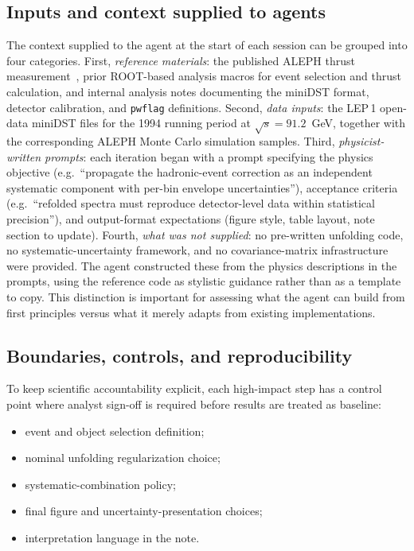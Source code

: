 \subsection{Inputs and context supplied to agents}
\label{sec:agent_inputs}

The context supplied to the agent at the start of each session can be grouped into four categories.
First, \textit{reference materials}: the published ALEPH thrust measurement~\cite{Heister:2003aj}, prior ROOT-based analysis macros for event selection and thrust calculation, and internal analysis notes documenting the miniDST format, detector calibration, and \texttt{pwflag} definitions.
Second, \textit{data inputs}: the LEP\,1 open-data miniDST files for the 1994 running period at $\sqrt{s}=91.2$~GeV, together with the corresponding ALEPH Monte Carlo simulation samples.
Third, \textit{physicist-written prompts}: each iteration began with a prompt specifying the physics objective (e.g.\ ``propagate the hadronic-event correction as an independent systematic component with per-bin envelope uncertainties''), acceptance criteria (e.g.\ ``refolded spectra must reproduce detector-level data within statistical precision''), and output-format expectations (figure style, table layout, note section to update).
Fourth, \textit{what was not supplied}: no pre-written unfolding code, no systematic-uncertainty framework, and no covariance-matrix infrastructure were provided. The agent constructed these from the physics descriptions in the prompts, using the reference code as stylistic guidance rather than as a template to copy. This distinction is important for assessing what the agent can build from first principles versus what it merely adapts from existing implementations.

\subsection{Boundaries, controls, and reproducibility}

To keep scientific accountability explicit, each high-impact step has a
control point where analyst sign-off is required before results are treated
as baseline:
\begin{itemize}
\item event and object selection definition;
\item nominal unfolding regularization choice;
\item systematic-combination policy;
\item final figure and uncertainty-presentation choices;
\item interpretation language in the note.
\end{itemize}

